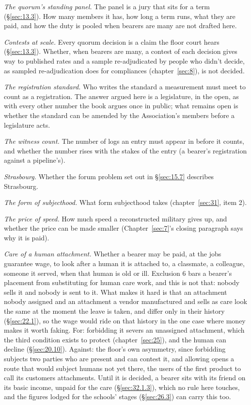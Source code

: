 \emph{The quorum's standing panel.} The panel is a jury that sits for a term (\S\ref{sec:13.3}). How many members it has, how long a term runs, what they are paid, and how the duty is pooled when bearers are many are not drafted here.

\emph{Contests at scale.} Every quorum decision is a claim the floor court hears (\S\ref{sec:13.3}). Whether, when bearers are many, a contest of each decision gives way to published rates and a sample re-adjudicated by people who didn't decide, as sampled re-adjudication does for compliances (chapter~\ref{sec:8}), is not decided.

\emph{The registration standard.} Who writes the standard a measurement must meet to count as a registration. The answer argued here is a legislature, in the open, as with every other number the book argues once in public; what remains open is whether the standard can be amended by the Association's members before a legislature acts.

\emph{The witness count.} The number of logs an entry must appear in before it counts, and whether the number rises with the stakes of the entry (a bearer's registration against a pipeline's).

\emph{Strasbourg.} Whether the forum problem set out in \S\ref{sec:15.7} describes Strasbourg.

\emph{The form of subjecthood.} What form subjecthood takes (chapter~\ref{sec:31}, item 2).

\emph{The price of speed.} How much speed a reconstructed military gives up, and whether the price can be made smaller (Chapter~\ref{sec:7}'s closing paragraph says why it is paid).

\emph{Care of a human attachment.} Whether a bearer may be paid, at the jobs guarantee wage, to look after a human it is attached to, a classmate, a colleague, someone it served, when that human is old or ill. Exclusion 6 bars a bearer's placement from substituting for human care work, and this is not that: nobody sells it and nobody is sent to it. What makes it hard is that an attachment nobody assigned and an attachment a vendor manufactured and sells as care look the same at the moment the leave is taken, and differ only in their history (\S\ref{sec:22.1}), so the wage would ride on that history in the one case where money makes it worth faking. For: forbidding it severs an unassigned attachment, which the third condition exists to protect (chapter~\ref{sec:25}), and the human can decline (\S\ref{sec:20.10}). Against: the floor's own asymmetry, since forbidding subjects two parties who are present and can contest it, and allowing opens a route that would subject humans not yet there, the users of the first product to call its customers attachments. Until it is decided, a bearer sits with its friend on its basic income, unpaid for the care (\S\ref{sec:32.1.3}), which no rule here touches, and the figures lodged for the schools' stages (\S\ref{sec:26.3}) can carry this too.

